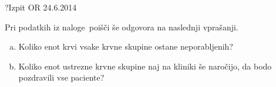\begin{naloga}{?}{Izpit OR 24.6.2014}
\begin{vprasanje}
Pri podatkih iz naloge~\nal[kri] poišči še odgovora na naslednji vprašanji.
\begin{enumerate}[(a)]
\item Koliko enot krvi vsake krvne skupine ostane neporabljenih?
\item Koliko enot ustrezne krvne skupine naj na kliniki še naročijo,
da bodo po\-zdra\-vi\-li vse paciente?
\end{enumerate}
\end{vprasanje}
\begin{odgovor}
\end{odgovor}
\end{naloga}
